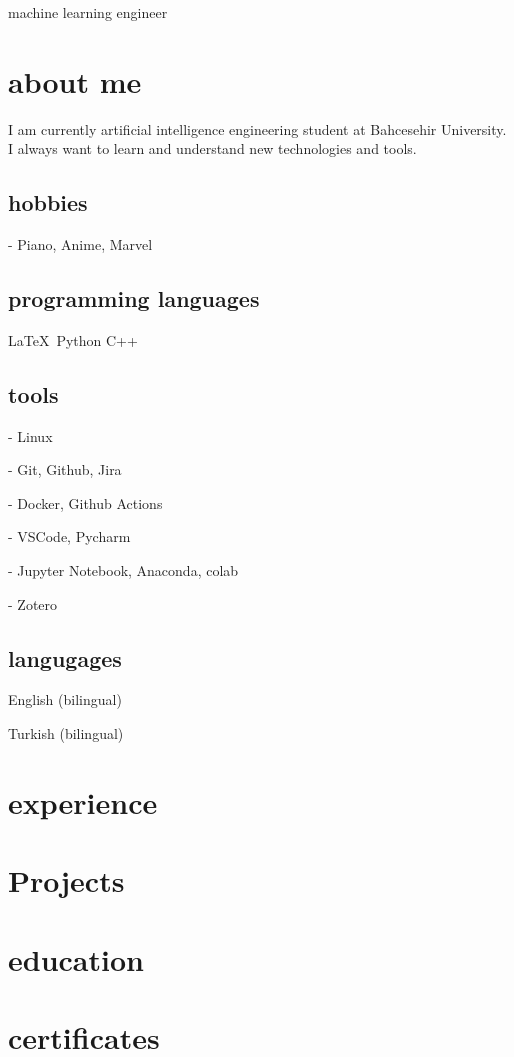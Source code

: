 \documentclass{resume-class} %
\begin{document}
\makeprofile

machine learning engineer
\drawsidebar
\section{about me}

I am currently artificial intelligence engineering student at Bahcesehir University. I always want to learn and understand new technologies and tools.

\subsection{hobbies}

- Piano, Anime, Marvel


\subsection{programming languages}

\LaTeX\ Python C++

\subsection{tools}
- Linux

- Git, Github, Jira

- Docker, Github Actions

- VSCode, Pycharm

- Jupyter Notebook, Anaconda, colab

- Zotero


\subsection{langugages}

English (bilingual)

Turkish (bilingual)


\section{experience}
\blindtext

\section{Projects}
\blindtext

\section{education}
\blindtext

\section{certificates}
\blindtext
\end{document}
